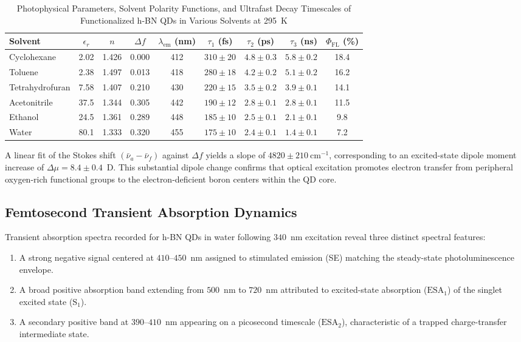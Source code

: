 \documentclass[journal=jpcbfk,manuscript=article,layout=twocolumn]{achemso}
\begin{document}
\begin{table}[t]
\caption{Photophysical Parameters, Solvent Polarity Functions, and Ultrafast Decay Timescales of Functionalized h-BN QDs in Various Solvents at 295~K}
\label{tab:photophysics}
\centering
\small
\setlength{\tabcolsep}{5pt}
\begin{tabular}{lccccccrc}
\toprule
Solvent & $\epsilon_r$ & $n$ & $\Delta f$ & $\lambda_{\text{em}}$ (nm) & $\tau_1$ (fs) & $\tau_2$ (ps) & $\tau_3$ (ns) & $\Phi_{\text{FL}}$ (\%) \\
\midrule
Cyclohexane     & 2.02  & 1.426 & 0.000 & 412 & $310 \pm 20$ & $4.8 \pm 0.3$ & $5.8 \pm 0.2$ & 18.4 \\
Toluene         & 2.38  & 1.497 & 0.013 & 418 & $280 \pm 18$ & $4.2 \pm 0.2$ & $5.1 \pm 0.2$ & 16.2 \\
Tetrahydrofuran & 7.58  & 1.407 & 0.210 & 430 & $220 \pm 15$ & $3.5 \pm 0.2$ & $3.9 \pm 0.1$ & 14.1 \\
Acetonitrile    & 37.5  & 1.344 & 0.305 & 442 & $190 \pm 12$ & $2.8 \pm 0.1$ & $2.8 \pm 0.1$ & 11.5 \\
Ethanol         & 24.5  & 1.361 & 0.289 & 448 & $185 \pm 10$ & $2.5 \pm 0.1$ & $2.1 \pm 0.1$ & 9.8  \\
Water           & 80.1  & 1.333 & 0.320 & 455 & $175 \pm 10$ & $2.4 \pm 0.1$ & $1.4 \pm 0.1$ & 7.2  \\
\bottomrule
\end{tabular}
\end{table}

A linear fit of the Stokes shift $(\bar{\nu}_a - \bar{\nu}_f)$ against $\Delta f$ yields a slope of $4820 \pm 210~\text{cm}^{-1}$, corresponding to an excited-state dipole moment increase of $\Delta \mu = 8.4 \pm 0.4$~D. This substantial dipole change confirms that optical excitation promotes electron transfer from peripheral oxygen-rich functional groups to the electron-deficient boron centers within the QD core.

\subsection{Femtosecond Transient Absorption Dynamics}

Transient absorption spectra recorded for h-BN QDs in water following $340$~nm excitation reveal three distinct spectral features:
\begin{enumerate}
\item A strong negative signal centered at $410$--$450$~nm assigned to stimulated emission (SE) matching the steady-state photoluminescence envelope.
\item A broad positive absorption band extending from $500$~nm to $720$~nm attributed to excited-state absorption ($\text{ESA}_1$) of the singlet excited state ($\text{S}_1$).
\item A secondary positive band at $390$--$410$~nm appearing on a picosecond timescale ($\text{ESA}_2$), characteristic of a trapped charge-transfer intermediate state.
\end{enumerate}
\end{document}
